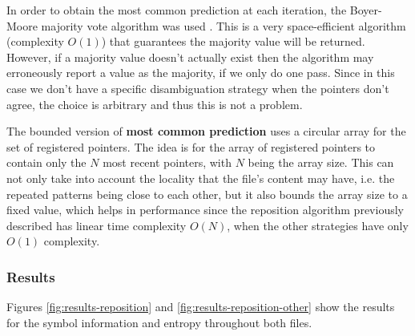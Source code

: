 \documentclass{article}
\begin{document}
In order to obtain the most common prediction at each iteration, the Boyer-Moore majority vote algorithm was used \cite{majority}.
This is a very space-efficient algorithm (complexity $O(1)$) that guarantees the majority value will be returned.
However, if a majority value doesn't actually exist then the algorithm may erroneously report a value as the majority, if we only do one pass.
Since in this case we don't have a specific disambiguation strategy when the pointers don't agree, the choice is arbitrary and thus this is not a problem.

The bounded version of \textbf{most common prediction} uses a circular array for the set of registered pointers.
The idea is for the array of registered pointers to contain only the $N$ most recent pointers, with $N$ being the array size.
This can not only take into account the locality that the file's content may have, i.e. the repeated patterns being close to each other, but it also bounds the array size to a fixed value, which helps in performance since the reposition algorithm previously described has linear time complexity $O(N)$, when the other strategies have only $O(1)$ complexity.

\subsubsection{Results}

Figures \ref{fig:results-reposition} and \ref{fig:results-reposition-other} show the results for the symbol information and entropy throughout both files.
\end{document}
